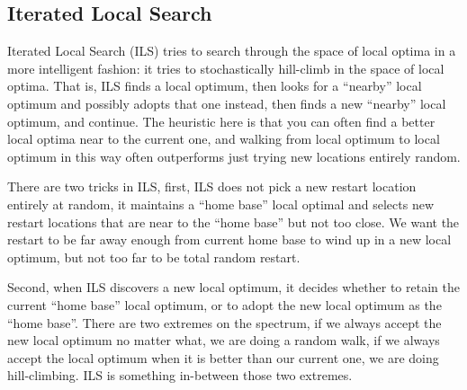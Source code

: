         \subsection{Iterated Local Search}
                Iterated Local Search (ILS) tries to search through the space of local optima in a more intelligent fashion: it tries to stochastically hill-climb in the space of local optima. That is, ILS finds a local optimum, then looks for a ``nearby'' local optimum and possibly adopts that one instead, then finds a new ``nearby'' local optimum, and continue. The heuristic here is that you can often find a better local optima near to the current one, and walking from local optimum to local optimum in this way often outperforms just trying new locations entirely random.

                There are two tricks in ILS, first, ILS does not pick a new restart location entirely at random, it maintains a ``home base'' local optimal and selects new restart locations that are near to the ``home base'' but not too close. We want the restart to be far away enough from current home base to wind up in a new local optimum, but not too far to be total random restart.

                Second, when ILS discovers a new local optimum, it decides whether to retain the current ``home base'' local optimum, or to adopt the new local optimum as the ``home base''. There are two extremes on the spectrum, if we always accept the new local optimum no matter what, we are doing a random walk, if we always accept the local optimum when it is better than our current one, we are doing hill-climbing. ILS is something in-between those two extremes.

